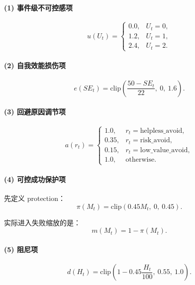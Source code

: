 \documentclass[11pt]{article}
\newcommand{\clip}{\mathrm{clip}}
\begin{document}
\paragraph{(1) 事件级不可控感项}
\begin{equation}
u(U_t)=
\begin{cases}
0.0, & U_t=0,\\
1.2, & U_t=1,\\
2.4, & U_t=2.
\end{cases}
\label{eq:uncontrollability}
\end{equation}

\paragraph{(2) 自我效能损伤项}
\begin{equation}
e(SE_t)=\clip\!\left(\frac{50-SE_t}{22},\ 0,\ 1.6\right).
\label{eq:efficacy-loss}
\end{equation}

\paragraph{(3) 回避原因调节项}
\begin{equation}
a(r_t)=
\begin{cases}
1.0, & r_t=\text{helpless\_avoid},\\
0.35, & r_t=\text{risk\_avoid},\\
0.15, & r_t=\text{low\_value\_avoid},\\
1.0, & \text{otherwise}.
\end{cases}
\label{eq:avoid-multiplier}
\end{equation}

\paragraph{(4) 可控成功保护项}
先定义 protection：
\begin{equation}
\pi(M_t)=\clip(0.45M_t,\ 0,\ 0.45).
\label{eq:success-protection}
\end{equation}

实际进入失败缩放的是：
\begin{equation}
m(M_t)=1-\pi(M_t).
\label{eq:success-protection-mult}
\end{equation}

\paragraph{(5) 阻尼项}
\begin{equation}
d(H_t)=\clip\!\left(1-0.45\frac{H_t}{100},\ 0.55,\ 1.0\right).
\label{eq:damping}
\end{equation}
\end{document}
